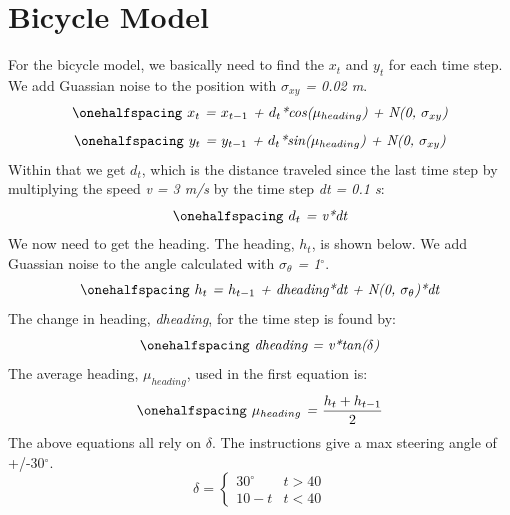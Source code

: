 \documentclass[12pt]{article}
\begin{document}


\newpage
\singlespacing
{}
\section{Bicycle Model}
\setlength{\parindent}{1cm}

For the bicycle model, we basically need to find the \textit{$x_t$} and \textit{$y_t$} for each time step. We add Guassian noise to the position with \textit{$\sigma_{xy}$ = 0.02 m}.
\begin{equation}
\onehalfspacing
\centering
\emph{ $x_t$ = $x_{t-1}$ + $d_t$*cos($\mu_{heading}$) + N(0, $\sigma_{xy}$)}
\end{equation}
\begin{equation}
\onehalfspacing
\centering
\emph{ $y_t$ = $y_{t-1}$ + $d_t$*sin($\mu_{heading}$) + N(0, $\sigma_{xy}$)}
\end{equation}
 Within that we get \textit{$d_t$}, which is the distance traveled since the last time step by multiplying the speed \textit{v = 3 m/s} by the time step  \textit{dt = 0.1 s}: 
\begin{equation}
\onehalfspacing
\centering
\emph{ $d_t$ =  v*dt}
\end{equation}
We now need to get the heading. The heading, \textit{$h_t$}, is shown below. We add Guassian noise to the angle calculated with \textit{$\sigma_\theta$ = 1$^\circ$}.
\begin{equation}
\onehalfspacing
\centering
\emph{ $h_t$ = $h_{t-1}$ + dheading*dt + N(0, $\sigma_\theta$)*dt}
\end{equation}
The change in heading, \textit{dheading}, for the time step is found by:
\begin{equation}
\onehalfspacing
\centering
\emph{ dheading = v*tan($\delta$)}
\end{equation}
The average heading, \textit{$\mu_{heading}$}, used in the first equation is: 
\begin{equation}
\onehalfspacing
\centering
\emph{ $\mu_{heading}$ = $\frac{h_t + h_{t-1}}{2}$}
\end{equation}
The above equations all rely on \textit{$\delta$}. The instructions give a max steering angle of +/-30$^\circ$.
\[ 
      \delta = 
      \begin{cases} 
      30^\circ & t > 40\\
      10 - t & t < 40
   \end{cases}
\]
\end{document}
